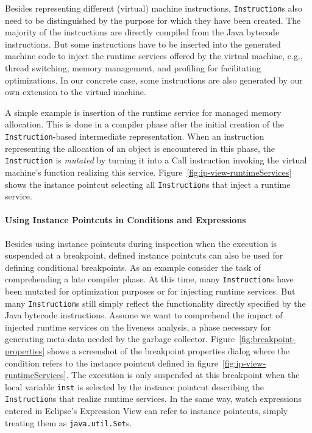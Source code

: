 Besides representing different (virtual) machine instructions, \lstinline!Instruction!s also need to be distinguished by the purpose for which they have been created.
The majority of the instructions are directly compiled from the Java bytecode instructions.
But some instructions have to be inserted into the generated machine code to inject the runtime services offered by the virtual machine, e.g., thread switching, memory management, and profiling for facilitating optimizations.
In our concrete case, some instructions are also generated by our own extension to the virtual machine.

A simple example is insertion of the runtime service for managed memory allocation.
This is done in a compiler phase after the initial creation of the \lstinline!Instruction!-based intermediate representation.
When an instruction representing the allocation of an object is encountered in this phase, the \lstinline!Instruction! is \emph{mutated} by turning it into a Call instruction invoking the virtual machine's function realizing this service.
Figure~\ref{fig:ip-view-runtimeServices} shows the instance pointcut selecting all \lstinline!Instruction!s that inject a runtime service.


\paragraph{Using Instance Pointcuts in Conditions and Expressions}

Besides using instance pointcuts during inspection when the execution is suspended at a breakpoint, defined instance pointcuts can also be used for defining conditional breakpoints.
As an example consider the task of comprehending a late compiler phase.
At this time, many \lstinline!Instruction!s have been mutated for optimization purposes or for injecting runtime services.
But many \lstinline!Instruction!s still simply reflect the functionality directly specified by the Java bytecode instructions.
Assume we want to comprehend the impact of injected runtime services on the liveness analysis, a phase necessary for generating meta-data needed by the garbage collector.
Figure~\ref{fig:breakpoint-properties} shows a screenshot of the breakpoint properties dialog where the condition refers to the instance pointcut defined in figure~\ref{fig:ip-view-runtimeServices}.
The execution is only suspended at this breakpoint when the local variable \lstinline!inst! is selected by the instance pointcut describing the \lstinline!Instruction!s that realize runtime services.
In the same way, watch expressions entered in Eclipse's Expression View can refer to instance pointcuts, simply treating them as \lstinline!java.util.Set!s.

